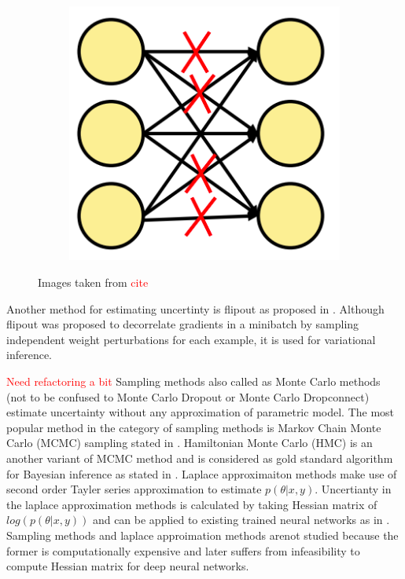 \begin{figure}[htbp]
\begin{subfigure}{0.33\textwidth}
            \caption{}
            \label{fig:SOTA_Dropout}
        \end{subfigure}
        \begin{subfigure}{0.33\textwidth}
            \centering
            \includegraphics[scale=0.33]{images/DConnect_SOTA.png}
            \caption{}
            \label{fig:SOTA_Dconnect}
        \end{subfigure}
        \caption{Images taken from \textcolor{red}{cite}}
        \label{fig:Dropout_Connect}
    \end{figure}
    Another method for estimating uncertinty is flipout as proposed in \cite{Flipout}.
    Although flipout was proposed to decorrelate gradients in a minibatch by sampling independent weight perturbations for each example, it is used for variational inference.
    
    \textcolor{red}{Need refactoring a bit}
    Sampling methods also called as Monte Carlo methods (not to be confused to Monte Carlo Dropout or Monte Carlo Dropconnect) estimate uncertainty without any approximation of parametric model.
    The most popular method in the category of sampling methods is Markov Chain Monte Carlo (MCMC) sampling stated in \cite{Bishop_Book}.
    Hamiltonian Monte Carlo (HMC) is an another variant of MCMC method and is considered as gold standard algorithm for Bayesian inference as stated in \cite{HMC}.
    Laplace approximaiton methods make use of second order Tayler series approximation to estimate $p(\theta|x, y)$.
    Uncertianty in the laplace approximation methods is calculated by taking Hessian matrix of $log(p(\theta|x, y))$ and can be applied to existing trained neural networks as in \cite{Laplace_approx}.
    Sampling methods and laplace approimation methods arenot studied because the former is computationally expensive and later suffers from infeasibility to compute Hessian matrix for deep neural networks.
    
